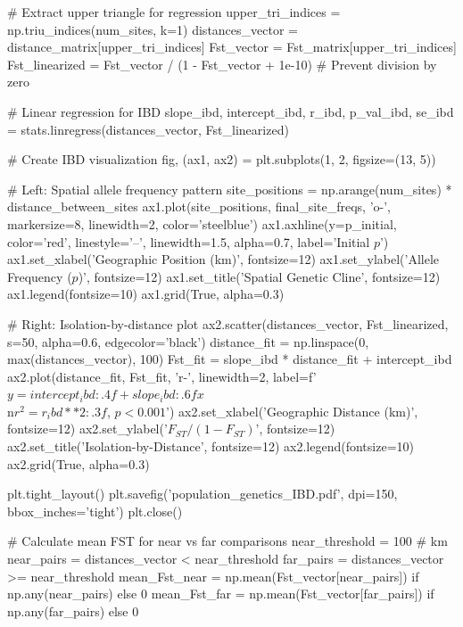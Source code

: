 \documentclass[11pt,a4paper]{article}
\begin{document}
\begin{pycode}
# Extract upper triangle for regression
upper_tri_indices = np.triu_indices(num_sites, k=1)
distances_vector = distance_matrix[upper_tri_indices]
Fst_vector = Fst_matrix[upper_tri_indices]
Fst_linearized = Fst_vector / (1 - Fst_vector + 1e-10)  # Prevent division by zero

# Linear regression for IBD
slope_ibd, intercept_ibd, r_ibd, p_val_ibd, se_ibd = stats.linregress(distances_vector, Fst_linearized)

# Create IBD visualization
fig, (ax1, ax2) = plt.subplots(1, 2, figsize=(13, 5))

# Left: Spatial allele frequency pattern
site_positions = np.arange(num_sites) * distance_between_sites
ax1.plot(site_positions, final_site_freqs, 'o-', markersize=8, linewidth=2, color='steelblue')
ax1.axhline(y=p_initial, color='red', linestyle='--', linewidth=1.5, alpha=0.7, label='Initial $p$')
ax1.set_xlabel('Geographic Position (km)', fontsize=12)
ax1.set_ylabel('Allele Frequency ($p$)', fontsize=12)
ax1.set_title('Spatial Genetic Cline', fontsize=12)
ax1.legend(fontsize=10)
ax1.grid(True, alpha=0.3)

# Right: Isolation-by-distance plot
ax2.scatter(distances_vector, Fst_linearized, s=50, alpha=0.6, edgecolor='black')
distance_fit = np.linspace(0, max(distances_vector), 100)
Fst_fit = slope_ibd * distance_fit + intercept_ibd
ax2.plot(distance_fit, Fst_fit, 'r-', linewidth=2,
         label=f'$y = {intercept_ibd:.4f} + {slope_ibd:.6f}x$\\n$r^2 = {r_ibd**2:.3f}$, $p < 0.001$')
ax2.set_xlabel('Geographic Distance (km)', fontsize=12)
ax2.set_ylabel('$F_{ST} / (1 - F_{ST})$', fontsize=12)
ax2.set_title('Isolation-by-Distance', fontsize=12)
ax2.legend(fontsize=10)
ax2.grid(True, alpha=0.3)

plt.tight_layout()
plt.savefig('population_genetics_IBD.pdf', dpi=150, bbox_inches='tight')
plt.close()

# Calculate mean FST for near vs far comparisons
near_threshold = 100  # km
near_pairs = distances_vector < near_threshold
far_pairs = distances_vector >= near_threshold
mean_Fst_near = np.mean(Fst_vector[near_pairs]) if np.any(near_pairs) else 0
mean_Fst_far = np.mean(Fst_vector[far_pairs]) if np.any(far_pairs) else 0
\end{pycode}
\end{document}
